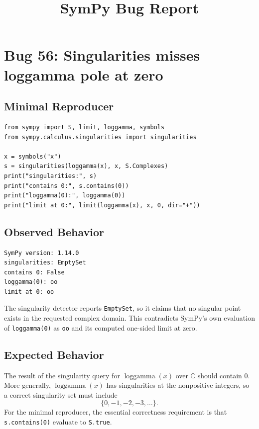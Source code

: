 \documentclass[11pt]{article}
\title{SymPy Bug Report}
\author{}
\date{}
\begin{document}
\maketitle

\section{Bug 56: Singularities misses loggamma pole at zero}

\subsection{Minimal Reproducer}

\medskip

\begin{lstlisting}[style=bugpython]
from sympy import S, limit, loggamma, symbols
from sympy.calculus.singularities import singularities

x = symbols("x")
s = singularities(loggamma(x), x, S.Complexes)
print("singularities:", s)
print("contains 0:", s.contains(0))
print("loggamma(0):", loggamma(0))
print("limit at 0:", limit(loggamma(x), x, 0, dir="+"))
\end{lstlisting}

\subsection{Observed Behavior}

\medskip

\begin{lstlisting}[style=bugpython]
SymPy version: 1.14.0
singularities: EmptySet
contains 0: False
loggamma(0): oo
limit at 0: oo
\end{lstlisting}

The singularity detector reports \texttt{EmptySet}, so it claims that no
singular point exists in the requested complex domain. This contradicts
SymPy's own evaluation of \texttt{loggamma(0)} as \texttt{oo} and its computed
one-sided limit at zero.

\subsection{Expected Behavior}

The result of the singularity query for \(\operatorname{loggamma}(x)\) over
\(\mathbb{C}\) should contain \(0\). More generally,
\(\operatorname{loggamma}(x)\) has singularities at the nonpositive integers, so
a correct singularity set must include
\[
    \{0, -1, -2, -3, \ldots\}.
\]
For the minimal reproducer, the essential correctness requirement is that
\texttt{s.contains(0)} evaluate to \texttt{S.true}.
\end{document}

